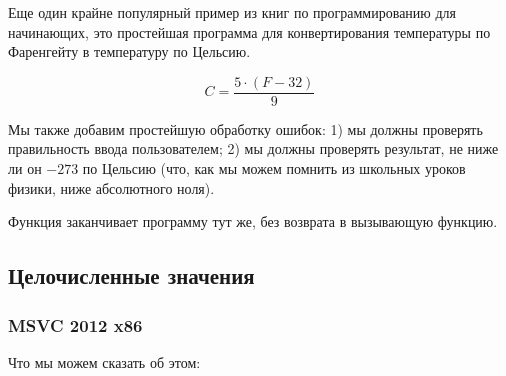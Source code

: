 
Еще один крайне популярный пример из книг по программированию для начинающих, это простейшая программа
для конвертирования температуры по Фаренгейту в температуру по Цельсию.

\[
	C=\frac{5 \cdot (F-32)}{9}
\]

Мы также добавим простейшую обработку ошибок:
1) мы должны проверять правильность ввода пользователем;
2) мы должны проверять результат, не ниже ли он $-273$ по Цельсию (что, как мы можем помнить из школьных
уроков физики, ниже абсолютного ноля).

Функция  заканчивает программу тут же, без возврата в вызывающую функцию.

\subsection{Целочисленные значения}



\subsubsection{\Optimizing MSVC 2012 x86}



Что мы можем сказать об этом:

